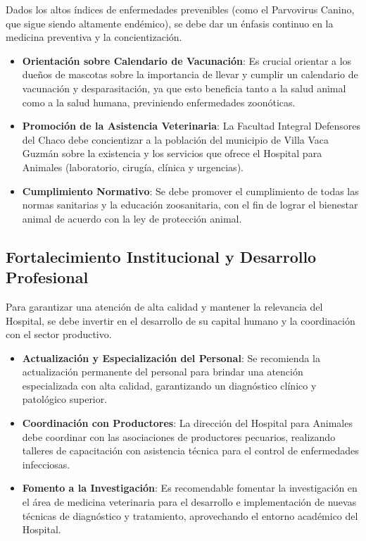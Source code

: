 Dados los altos índices de enfermedades prevenibles (como el Parvovirus Canino, que sigue siendo altamente endémico), se debe dar un énfasis continuo en la medicina preventiva y la concientización.

\begin{itemize}
    \item \textbf{Orientación sobre Calendario de Vacunación}: Es crucial orientar a los dueños de mascotas sobre la importancia de llevar y cumplir un calendario de vacunación y desparasitación, ya que esto beneficia tanto a la salud animal como a la salud humana, previniendo enfermedades zoonóticas.

    \item \textbf{Promoción de la Asistencia Veterinaria}: La Facultad Integral Defensores del Chaco debe concientizar a la población del municipio de Villa Vaca Guzmán sobre la existencia y los servicios que ofrece el Hospital para Animales (laboratorio, cirugía, clínica y urgencias).

    \item \textbf{Cumplimiento Normativo}: Se debe promover el cumplimiento de todas las normas sanitarias y la educación zoosanitaria, con el fin de lograr el bienestar animal de acuerdo con la ley de protección animal.
\end{itemize}

\subsection{Fortalecimiento Institucional y Desarrollo Profesional}

Para garantizar una atención de alta calidad y mantener la relevancia del Hospital, se debe invertir en el desarrollo de su capital humano y la coordinación con el sector productivo.

\begin{itemize}
    \item \textbf{Actualización y Especialización del Personal}: Se recomienda la actualización permanente del personal para brindar una atención especializada con alta calidad, garantizando un diagnóstico clínico y patológico superior.

    \item \textbf{Coordinación con Productores}: La dirección del Hospital para Animales debe coordinar con las asociaciones de productores pecuarios, realizando talleres de capacitación con asistencia técnica para el control de enfermedades infecciosas.

    \item \textbf{Fomento a la Investigación}: Es recomendable fomentar la investigación en el área de medicina veterinaria para el desarrollo e implementación de nuevas técnicas de diagnóstico y tratamiento, aprovechando el entorno académico del Hospital.
\end{itemize}
